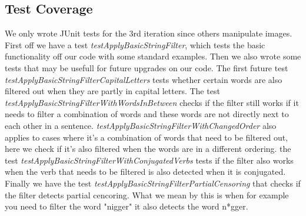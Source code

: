 \subsection{Test Coverage}
We only wrote JUnit tests for the 3rd iteration since others manipulate images.
First off we have a test \textit{testApplyBasicStringFilter}, which tests the basic functionality off our code with some standard examples. 
Then we also wrote some tests that may be usefull for future upgrades on our code.
The first future test \textit{testApplyBasicStringFilterCapitalLetters} tests whether certain words 
are also filtered out when they are partly in capital letters. 
The test \textit{testApplyBasicStringFilterWithWordsInBetween} checks if the filter still works if 
it needs to filter a combination of words and these words are not directly next to each other in a sentence.
\textit{testApplyBasicStringFilterWithChangedOrder} also applies to cases where it's a combination of
words that need to be filtered out, here we check if it's also filtered when the words are in a different 
ordering.
the test \textit{testApplyBasicStringFilterWithConjugatedVerbs} tests if the filter also works when the 
verb that needs to be filtered is also detected when it is conjugated.
Finally we have the test \textit{testApplyBasicStringFilterPartialCensoring} that checks if the filter detects 
partial cencoring. What we mean by this is when for example you need to filter the word "nigger" it also
detects the word n*gger.
